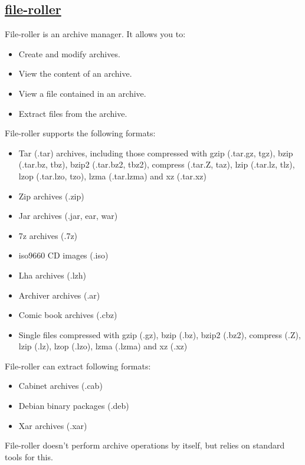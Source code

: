\subsection{\href{http://fileroller.sourceforge.net/}{file-roller}}

 File-roller is an archive manager. It allows you to:

\begin{itemize}
 \item Create and modify archives.
 \item View the content of an archive.
 \item View a file contained in an archive.
 \item Extract files from the archive.
\end{itemize}
 
 File-roller supports the following formats:

\begin{itemize}
 \item Tar (.tar) archives, including those compressed with
    gzip (.tar.gz, tgz), bzip (.tar.bz, tbz), bzip2 (.tar.bz2, tbz2),
    compress (.tar.Z, taz), lzip (.tar.lz, tlz), lzop (.tar.lzo, tzo),
    lzma (.tar.lzma) and xz (.tar.xz)
 \item Zip archives (.zip)
 \item Jar archives (.jar, ear, war)
 \item 7z archives (.7z)
 \item iso9660 CD images (.iso)
 \item Lha archives (.lzh)
 \item Archiver archives (.ar)
 \item Comic book archives (.cbz)
 \item Single files compressed with gzip (.gz), bzip (.bz), bzip2 (.bz2),
    compress (.Z), lzip (.lz), lzop (.lzo), lzma (.lzma) and xz (.xz)
\end{itemize}
 
 File-roller can extract following formats:

\begin{itemize}
 \item Cabinet archives (.cab)
 \item Debian binary packages (.deb)
 \item Xar archives (.xar)
\end{itemize}
 
 File-roller doesn't perform archive operations by itself, but relies on
 standard tools for this.

